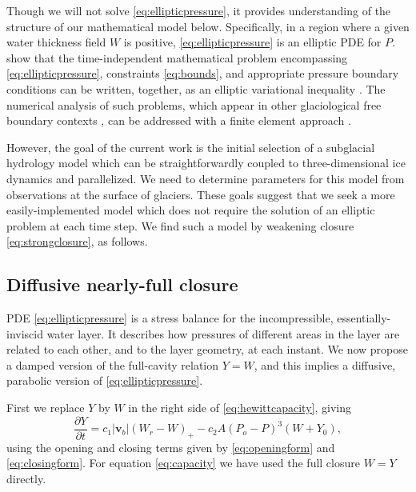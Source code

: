 \documentclass[11pt,final]{amsart}%
\newcommand\bv{\mathbf{v}}
\begin{document}
Though we will not solve \eqref{eq:ellipticpressure}, it provides understanding of the structure of our mathematical model below.  Specifically, in a region where a given water thickness field $W$ is positive, \eqref{eq:ellipticpressure} is an elliptic PDE for $P$.  \cite{Schoofetal2012} show that the time-independent mathematical problem encompassing \eqref{eq:ellipticpressure}, constraints \eqref{eq:bounds}, and appropriate pressure boundary conditions can be written, together, as an elliptic variational inequality \citep{KinderlehrerStampacchia}.  The numerical analysis of such problems, which appear in other glaciological free boundary contexts \citep{SchoofStream,JouvetBueler2012}, can be addressed with a finite element approach \citep{Ciarlet}.

However, the goal of the current work is the initial selection of a subglacial hydrology model which can be straightforwardly coupled to three-dimensional ice dynamics and parallelized.  We need to determine parameters for this model from observations at the surface of glaciers.  These goals suggest that we seek a more easily-implemented model which does not require the solution of an elliptic problem at each time step.  We find such a model by weakening closure \eqref{eq:strongclosure}, as follows.

\subsection*{Diffusive nearly-full closure}  PDE \eqref{eq:ellipticpressure} is a stress balance for the incompressible, essentially-inviscid water layer.  It describes how pressures of different areas in the layer are related to each other, and to the layer geometry, at each instant.  We now propose a damped version of the full-cavity relation $Y=W$, and this implies a diffusive, parabolic version of \eqref{eq:ellipticpressure}.

First we replace $Y$ by $W$ in the right side of \eqref{eq:hewittcapacity}, giving
\begin{equation}
\frac{\partial Y}{\partial t} = c_1 |\bv_b| (W_r - W)_+ - c_2 A (P_o - P)^3 (W+Y_0), \label{eq:capacity}
\end{equation}
using the opening and closing terms given by \eqref{eq:openingform} and \eqref{eq:closingform}.  For equation \eqref{eq:capacity} we have used the full closure $W=Y$ directly.
\end{document}

